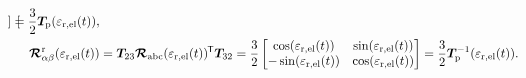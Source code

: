 \begin{frame}
\begin{equation}
\begin{alignedat}{2}
\begin{bmatrix}
			                                                                                                                                                                                  \end{bmatrix} = \frac{3}{2}\bm{T}_\mathrm{p}(\varepsilon_\mathrm{r,el}(t)),      \\
			\bm{\mathcal{R}}^\mathrm{r}_{\alpha\beta}(\varepsilon_\mathrm{r,el}(t)) & = \bm{T}_{23}\bm{\mathcal{R}}_\mathrm{abc}(\varepsilon_\mathrm{r,el}(t))^{\mkern-1.5mu\mathsf{T}}\bm{T}_{32} &  & = \frac{3}{2}\begin{bmatrix}
				                                                                                                                                                                                  \cos(\varepsilon_\mathrm{r,el}(t))  & \sin(\varepsilon_\mathrm{r,el}(t)) \\
				                                                                                                                                                                                  -\sin(\varepsilon_\mathrm{r,el}(t)) & \cos(\varepsilon_\mathrm{r,el}(t))
			                                                                                                                                                                                  \end{bmatrix} = \frac{3}{2}\bm{T}_\mathrm{p}^{-1}(\varepsilon_\mathrm{r,el}(t)).
		\end{alignedat}
		\label{eq:IM_model_alpha_beta_rotation_matrices}
	\end{equation}
\end{frame}


